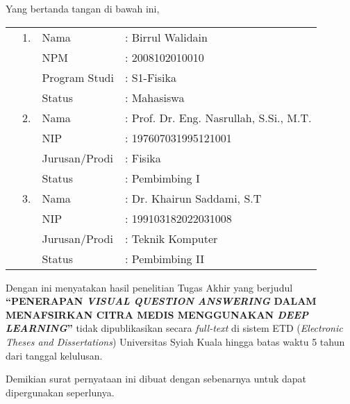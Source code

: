 \spernyataan %

\noindent
Yang bertanda tangan di bawah ini,
\vspace{-0.1cm}
\begin{table}[H]
{\renewcommand{\arraystretch}{0.7}
\begin{tabular}{M{0.6cm}lll}
	&1. 	& Nama   		&: Birrul Walidain \\
	&	& NPM       			&: 2008102010010   \\
	&	& Program Studi  		&: S1-Fisika \\
	&	& Status 				&: Mahasiswa \\  
	&2. 	& Nama  		&: Prof. Dr. Eng. Nasrullah, S.Si., M.T. \\
	&	& NIP       			&: 197607031995121001   \\
	&	& Jurusan/Prodi   		&: Fisika \\
	&	& Status 				&: Pembimbing I \\  
	&3. 	& Nama  		&: Dr. Khairun Saddami, S.T \\
	&	& NIP       			&: 199103182022031008   \\
	&	& Jurusan/Prodi   		&: Teknik Komputer \\
	&	& Status 				&: Pembimbing II   
\end{tabular}
}
\end{table}
\vspace{-0.4cm}
\noindent
Dengan ini menyatakan hasil penelitian Tugas Akhir yang berjudul \textbf{“PENERAPAN \textit{VISUAL QUESTION ANSWERING} DALAM MENAFSIRKAN CITRA MEDIS MENGGUNAKAN \textit{DEEP LEARNING}”} tidak dipublikasikan secara \textit{full-text} di sistem ETD (\textit{Electronic Theses and Dissertations}) Universitas Syiah Kuala hingga batas waktu 5 tahun dari tanggal kelulusan.

\vspace{0.4cm}
\noindent
Demikian surat pernyataan ini dibuat dengan sebenarnya untuk dapat dipergunakan seperlunya.

